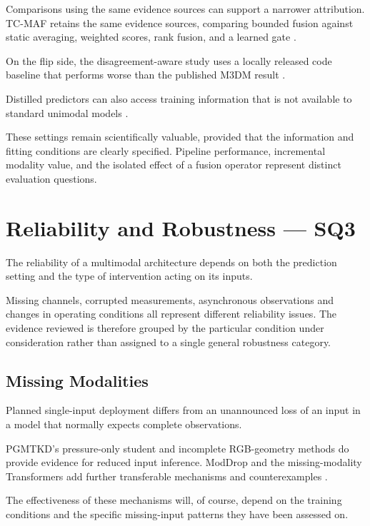 Comparisons using the same evidence sources can support a narrower attribution. TC-MAF retains the
same evidence sources, comparing bounded fusion against static averaging, weighted scores, rank
fusion, and a learned gate \parencite[PDF p.~7, Table~3]{P026}.

On the flip side, the disagreement-aware study uses a locally released code baseline that performs
worse than the published M3DM result \parencite[PDF p.~10, Table~4]{P033}.

Distilled predictors can also access training information that is not available to standard unimodal
models \parencite{Li2025PGMTKD}.

These settings remain scientifically valuable, provided that the information and fitting conditions
are clearly specified. Pipeline performance, incremental modality value, and the isolated effect of
a fusion operator represent distinct evaluation questions.

\section{Reliability and Robustness --- SQ3}

The reliability of a multimodal architecture depends on both the prediction setting and the type of
intervention acting on its inputs.

Missing channels, corrupted measurements, asynchronous observations and changes in operating
conditions all represent different reliability issues. The evidence reviewed is therefore grouped by
the particular condition under consideration rather than assigned to a single general robustness
category.

\subsection{Missing Modalities}

Planned single-input deployment differs from an unannounced loss of an input in a model that
normally expects complete observations.

PGMTKD's pressure-only student and incomplete RGB-geometry methods do provide evidence for reduced
input inference. ModDrop and the missing-modality Transformers add further transferable mechanisms
and counterexamples \parencite{Li2025PGMTKD,Sui2026Incomplete,P005,P016}.

The effectiveness of these mechanisms will, of course, depend on the training conditions and the
specific missing-input patterns they have been assessed on.

